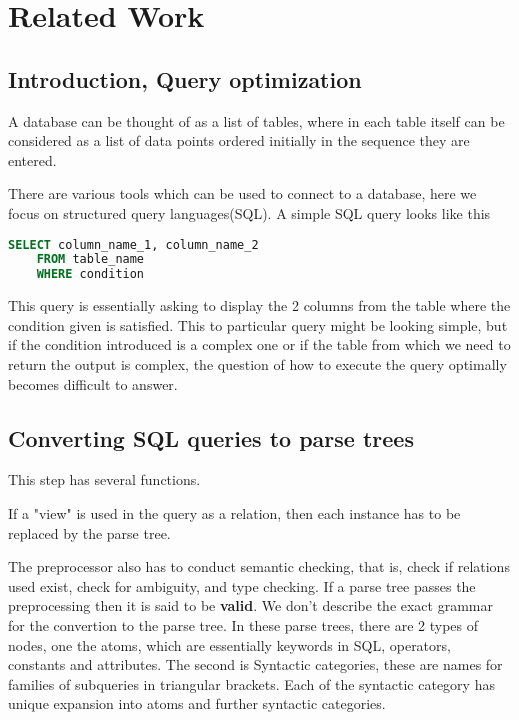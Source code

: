 \chapter{Related Work}
\label{chapter:related_work}
\thispagestyle{myheadings}

\graphicspath{{2_Body/Figures/}}

\section{Introduction, Query optimization}
A database can be thought of as a list of tables, where in each table itself can be considered as a list of data points ordered initially in the sequence they are entered.
\par There are various tools which can be used to connect to a database, here we focus on structured query languages(SQL). A simple SQL query looks like this
\begin{lstlisting}[language=SQL]
    SELECT column_name_1, column_name_2
    FROM table_name
    WHERE condition
\end{lstlisting}
This query is essentially asking to display the 2 columns from the table where the condition given is satisfied. This to particular query might be looking simple, but if the condition introduced is a complex one or if the table from which we need to return the output is complex, the question of how to execute the query optimally becomes difficult to answer.

\section{Converting SQL queries to parse trees}
This step has several functions.
\par If a "view" is used in the query as a relation, then each instance has to be replaced by the parse tree.
\par The preprocessor also has to conduct semantic checking, that is, check if relations used exist, check for ambiguity, and type checking. If a parse tree passes the preprocessing then it is said to be \textbf{valid}. We don't describe the exact grammar for the convertion to the parse tree. In these parse trees, there are 2 types of nodes, one the atoms, which are essentially keywords in SQL, operators, constants and attributes. The second is Syntactic categories, these are names for families of subqueries in triangular brackets. Each of the syntactic category has unique expansion into atoms and further syntactic categories.


